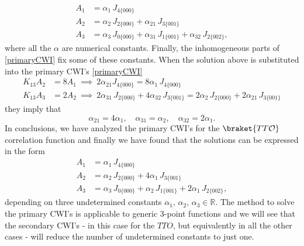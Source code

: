 \documentclass[a4paper,11pt,openright,twoside]{book}
\newcommand{\mO}{\mathcal{O}}
\let\a=\alpha   \let\b=\beta   \let\g=\gamma   \let\d=\delta
\numberwithin{equation}{section}
\begin{document}
{{{\begin{align}
	A_1&=\a_1\,J_{4\{000\}}\\[1.1ex]
	A_2&=\a_2\,J_{2\{000\}}+\a_{21}\,J_{3\{001\}}\\[1.1ex]
	A_3&=\a_3\,J_{0\{000\}}+\a_{31}\,J_{1\{001\}}+\a_{32}\,J_{2\{002\}},
\end{align}
where all the $\a$ are numerical constants. Finally, the inhomogeneous parts of \eqref{primaryCWI} fix some of these constants. When the solution above is substituted into the primary CWI's \eqref{primaryCWI} 
\begin{align}
	K_{13}A_2&=8A_1\ \implies\ 2\a_{21}J_{4\{000\}}=8\a_1\,J_{4\{000\}}\\
	K_{13}A_3&=2A_2\ \implies \ 2\a_{31}\,J_{2\{000\}}+4\a_{32}\,J_{3\{001\}}=2\a_2\,J_{2\{000\}}+2\a_{21}\,J_{3\{001\}}
\end{align}
they imply that
\begin{equation}
	\a_{21}=4\a_1,\quad \a_{31}=\a_2,\quad\a_{32}=2\a_1.
\end{equation}
In conclusions, we have analyzed the primary CWI's for the $\braket{TT\mO}$ correlation function and finally we have found that the solutions can be expressed in the form 
\begin{equation}
	\begin{split}
		A_1&=\a_1\,J_{4\{000\}}\\[1.1ex]
		A_2&=\a_2\,J_{2\{000\}}+4\a_{1}\,J_{3\{001\}}\\[1.1ex]
		A_3&=\a_3\,J_{0\{000\}}+\a_{2}\,J_{1\{001\}}+2\a_{1}\,J_{2\{002\}},
	\end{split}\label{primarysolution}
\end{equation}
depending on three undetermined constants $\a_1,\,\a_2,\,\a_3\in\mathbb R$. The method to solve the primary CWI's is applicable to generic 3-point functions and we will see that the secondary CWI's - in this case for the $TTO$, but equivalently in all the other cases - will reduce the number of undetermined constants to just one.


}}}
\end{document}
